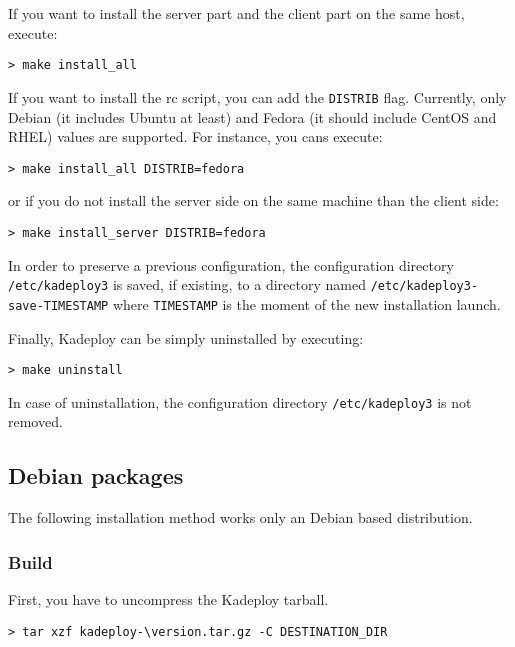 \documentclass[a4wide,10pt,oneside]{book}
\newcommand{\version}{3.1.7}
\begin{document}
\noindent If you want to install the server part and the client part on the same host, execute:
\begin{small}
\begin{verbatim}
> make install_all
\end{verbatim}
\end{small}

\noindent If you want to install the rc script, you can add the \texttt{DISTRIB} flag. Currently, only Debian (it includes Ubuntu at least) and Fedora (it should include CentOS and RHEL) values are supported. For instance, you cans execute:
\begin{small}
\begin{verbatim}
> make install_all DISTRIB=fedora
\end{verbatim}
\end{small}
or if you do not install the server side on the same machine than the client side:
\begin{small}
\begin{verbatim}
> make install_server DISTRIB=fedora
\end{verbatim}
\end{small}

\noindent In order to preserve a previous configuration, the configuration directory \texttt{/etc/kadeploy3} is saved, if existing, to a directory named \texttt{/etc/kadeploy3-save-TIMESTAMP} where \texttt{TIMESTAMP} is the moment of the new installation launch.

\noindent Finally, Kadeploy can be simply uninstalled by executing:
\begin{small}
\begin{verbatim}
> make uninstall
\end{verbatim}
\end{small}

\noindent In case of uninstallation, the configuration directory \texttt{/etc/kadeploy3} is not removed.

\subsection{Debian packages}
The following installation method works only an Debian based distribution.
\subsubsection{Build}
\noindent First, you have to uncompress the Kadeploy tarball.
\begin{small}
\begin{Verbatim}[commandchars=\\\{\}]
> tar xzf kadeploy-\version.tar.gz -C DESTINATION_DIR
\end{Verbatim}
\end{small}
\end{document}
